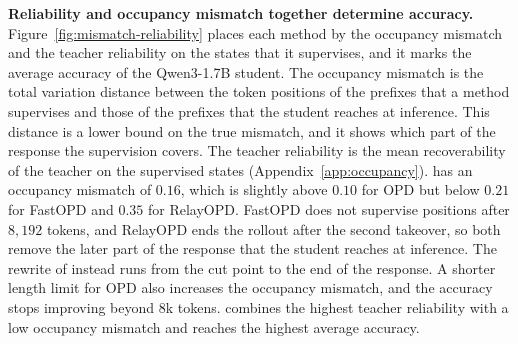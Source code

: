 \noindent\textbf{Reliability and occupancy mismatch together determine accuracy.}
Figure~\ref{fig:mismatch-reliability} places each method by the occupancy mismatch and the teacher reliability on the states that it supervises, and it marks the average accuracy of the Qwen3-1.7B student.
The occupancy mismatch is the total variation distance between the token positions of the prefixes that a method supervises and those of the prefixes that the student reaches at inference.
This distance is a lower bound on the true mismatch, and it shows which part of the response the supervision covers.
The teacher reliability is the mean recoverability of the teacher on the supervised states (Appendix~\ref{app:occupancy}).
\ours{} has an occupancy mismatch of $0.16$, which is slightly above $0.10$ for OPD but below $0.21$ for FastOPD and $0.35$ for RelayOPD.
FastOPD does not supervise positions after $8{,}192$ tokens, and RelayOPD ends the rollout after the second takeover, so both remove the later part of the response that the student reaches at inference.
The rewrite of \ours{} instead runs from the cut point to the end of the response.
A shorter length limit for OPD also increases the occupancy mismatch, and the accuracy stops improving beyond 8k tokens.
\ours{} combines the highest teacher reliability with a low occupancy mismatch and reaches the highest average accuracy.


